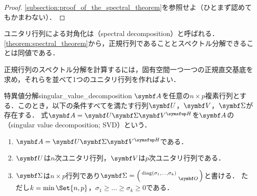 \documentclass[../../main]{subfiles}
\begin{document}
\begin{proof}
  \cref{subsection:proof_of_the_spectral_theorem}を参照せよ（ひとまず認めてもかまわない）．
\end{proof}

ユニタリ行列による対角化は（spectral decomposition）と呼ばれる．
\cref{theorem:spectral_theorem}から，正規行列であることとスペクトル分解できることは同値である．

\begin{note}
  正規行列のスペクトル分解を計算するには，固有空間一つ一つの正規直交基底を求め，それらを並べて1つのユニタリ行列を作ればよい．
\end{note}

\begin{corollary}{特異値分解}{singular_value_decomposition}
  \(\mat{A}\)を任意の\(n\times p\)複素行列とする．このとき，以下の条件すべてを満たす行列\(\mat{U}\)，\(\mat{V}\)，\(\mat{\Sigma}\)が存在する．
  式\(\mat{A}=\mat{U}\mat{\Sigma}\htrps{\mat{V}}\)を\(\mat{A}\)の（singular value decomposition; SVD）という．
  \begin{enumerate}
    \item \(\mat{A}=\mat{U}\mat{\Sigma}\htrps{\mat{V}}\)である．
    \item \(\mat{U}\)は\(n\)次ユニタリ行列，\(\mat{V}\)は\(p\)次ユニタリ行列である．
    \item \(\mat{\Sigma}\)は\(n\times p\)行列であり\(\mat{\Sigma}=\smallmatrice{\diag(\sigma_1,\dots,\sigma_k) & \\ & \zmat}\)と書ける．
      ただし\(k=\min\Set{n,p}\)，\(\sigma_1\geq\dots\geq\sigma_k\geq 0\)である．
  \end{enumerate}
\end{corollary}
\end{document}
